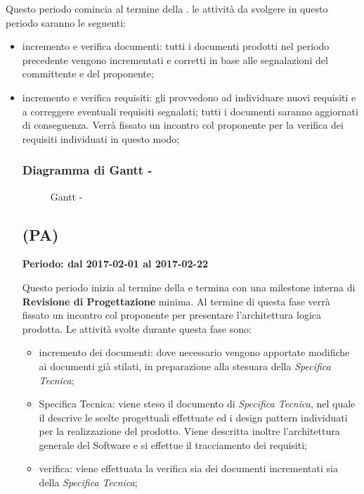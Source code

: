 \documentclass[./PianoDiProgetto.tex]{subfiles}
\begin{document}
  Questo periodo comincia al termine della \PerAR.  le attività da svolgere in questo periodo saranno le seguenti:
  \begin{itemize}
    \item incremento e verifica documenti: tutti i documenti prodotti nel periodo precedente vengono incrementati e corretti in base alle segnalazioni del committente e del proponente;
    \item incremento e verifica requisiti:  gli \ANP provvedono ad individuare nuovi requisiti e a correggere eventuali requisiti segnalati; tutti i documenti saranno aggiornati di conseguenza. Verrà fissato un incontro col proponente per la verifica dei requisiti individuati in questo modo;
  \subsubsection{Diagramma di Gantt - \PerAD}
    \begin{figure}[!h]
    \centering
    \caption{Gantt - \PerAD}
    \end{figure}

  \subsection{\PerPA{} (PA)}
  \textbf{Periodo: dal 2017-02-01 al 2017-02-22}

  Questo periodo inizia al termine della \PerAD{} e termina con una milestone interna di \textbf{Revisione di Progettazione} minima. Al termine di questa fase verrà fissato un incontro col proponente per presentare l'architettura logica prodotta. Le attività svolte durante questa fase sono:
  \begin{itemize}
    \item incremento dei documenti: dove necessario vengono apportate modifiche ai documenti già stilati, in preparazione alla stesuara della \textit{Specifica Tecnica};
    \item Specifica Tecnica: viene steso il documento di \textit{Specifica Tecnica}, nel quale il \PJ{} descrive le scelte progettuali effettuate ed i design pattern individuati per la realizzazione del prodotto. Viene descritta inoltre l'architettura generale del Software e si effettue il tracciamento dei requisiti;
    \item verifica: viene effettuata la verifica sia dei documenti incrementati sia della \textit{Specifica Tecnica};
  \end{itemize}

  \end{itemize}
\end{document}
